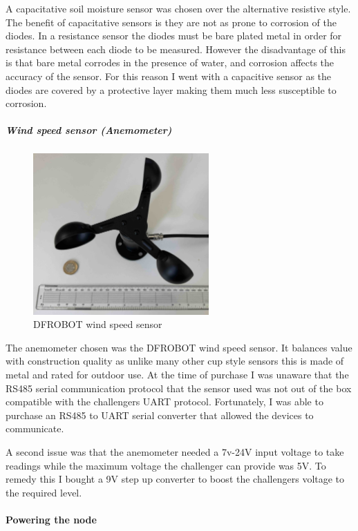 A capacitative soil moisture sensor was chosen over the alternative resistive
style. The benefit of capacitative sensors is they are not as prone to corrosion
of the diodes. In a resistance sensor the diodes must be bare plated metal in
order for resistance between each diode to be measured. However the disadvantage
of this is that bare metal corrodes in the presence of water, and corrosion
affects the accuracy of the sensor. For this reason I went with a capacitive
sensor as the diodes are covered by a protective layer making them much less
susceptible to corrosion.

\subparagraph{Wind speed sensor (Anemometer)}

\begin{figure}[H]
    \centering
    \includegraphics[width=0.6\textwidth]{contents/part-2/fig2/wind-sensor.jpg}
    \caption{DFROBOT wind speed sensor}
    \label{fig:wind-sensor}
\end{figure}

The anemometer chosen was the DFROBOT wind speed sensor. It balances value with
construction quality as unlike many other cup style sensors this is made of
metal and rated for outdoor use. At the time of purchase I was unaware that the
RS485 serial communication protocol that the sensor used was not out of the box
compatible with the challengers UART protocol. Fortunately, I was able to
purchase an RS485 to UART serial converter that allowed the devices to
communicate.

A second issue was that the anemometer needed a 7v-24V input voltage to take
readings while the maximum voltage the challenger can provide was 5V. To remedy
this I bought a 9V step up converter to boost the challengers voltage to the
required level.

\paragraph{Powering the node}

